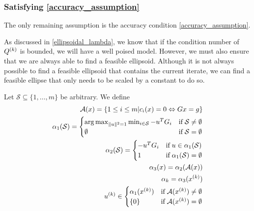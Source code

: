 

\subsubsection{Satisfying \cref{accuracy_assumption}}
\label{satisfying_accuracy}
The only remaining assumption is the accuracy condition \cref{accuracy_assumption}.

As discussed in \cref{ellipsoidal_lambda}, we know that if the condition number of ${Q^{(k)}}$ is bounded, we will have a well poised model.
However, we must also ensure that we are always able to find a feasible ellipsoid.
Although it is not always possible to find a feasible ellipsoid that contains the current iterate,
we can find a feasible ellipse that only needs to be scaled by a constant to do so.



Let $\mathcal S \subseteq \{1, \ldots, m\}$ be arbitrary.
We define
\begin{align}
\mathcal A(x) = \{1 \le i \le m | c_i(x) = 0 \Leftrightarrow Gx = g \} \label{active_indices} \\
\alpha_1(\mathcal S) = \begin{cases}
\operatorname*{arg\,max}_{\|u\|^2 = 1} \min_{i \in \mathcal S} -u^TG_i & \text{if} \; \mathcal S \ne \emptyset \\
\emptyset & \text{if} \; \mathcal S = \emptyset
\end{cases} \label{define_alpha_one} \\
\alpha_2(\mathcal S) = \begin{cases}
-u^TG_i  & \text{if} \; u \in \alpha_1(\mathcal S)  \\
1 & \text{if} \; \alpha_1(\mathcal S) = \emptyset
\end{cases}\label{define_alpha_two}\\
\alpha_3(x) = \alpha_2(\mathcal A(x)) \label{define_alpha_three} \\
\alpha_k =  \alpha_3({x^{(k)}}) \label{define_alpha_k} \\
u^{(k)} \in 
 \begin{cases}
\alpha_1({x^{(k)}}) & \text{if} \; \mathcal A({x^{(k)}}) \ne \emptyset \\
\{0\} & \text{if} \; \mathcal A({x^{(k)}}) = \emptyset
\end{cases} \\
\end{align}


